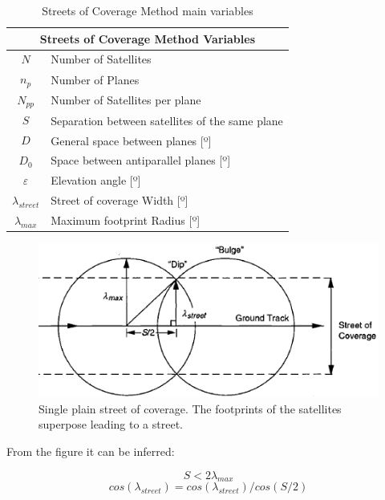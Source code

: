 \begin{table}[H]
\centering
\begin{tabular}{|c|l|}
\hline
\multicolumn{2}{|c|}{Streets of Coverage Method Variables}     \\ \hline
$$N$$              & Number of Satellites                      \\ \hline
$n_{p}$            & Number of Planes                          \\ \hline
$N_{pp}$           & Number of Satellites per plane            \\ \hline
$$S$$              & Separation between satellites of the same plane \\ \hline
$$D$$              & General space between planes {[}º{]}      \\ \hline
$D_{0}$            & Space between antiparallel planes {[}º{]} \\ \hline
$\varepsilon$      & Elevation angle {[}º{]}                   \\ \hline
$\lambda_{street}$ & Street of coverage Width {[}º{]}          \\ \hline
$\lambda_{max}$    & Maximum footprint Radius {[}º{]}          \\ \hline
\end{tabular}
\caption{Streets of Coverage Method main variables}
\end{table}  

\begin{figure}[H]
\begin{center}
\includegraphics[scale=0.7]{PolarOrbits/planestreet.png}
\caption{Single plain street of coverage. The footprints of the satellites superpose leading to a street.\cite{ccar}}
\end{center}
\end{figure}

From the figure it can be inferred:

$$S < 2\lambda_{max}$$
$$cos(\lambda_{street}) = cos(\lambda_{street})/cos(S/2)$$

